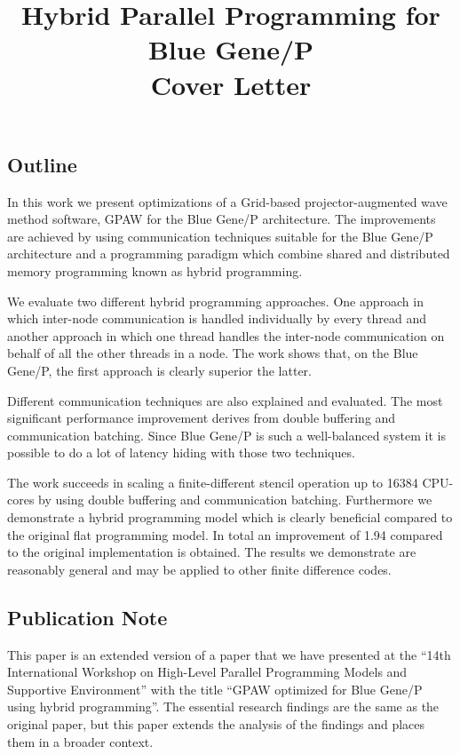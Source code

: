 \documentclass[a4paper,10pt]{article}
\title{Hybrid Parallel Programming for Blue Gene/P \\ Cover Letter}
\date{}
\begin{document}
\maketitle

\subsection*{Outline}
In this work we present optimizations of a Grid-based projector-augmented wave method software, GPAW for the Blue Gene/P architecture. The improvements are achieved by using communication techniques suitable for the Blue Gene/P architecture and a programming paradigm which combine shared and distributed memory programming known as hybrid programming.

We evaluate two different hybrid programming approaches. One approach in which inter-node communication is handled individually by every thread and another approach in which one thread handles the inter-node communication on behalf of all the other threads in a node. The work shows that, on the Blue Gene/P, the first approach is clearly superior the latter. 

Different communication techniques are also explained and evaluated. The most significant performance improvement derives from double buffering and communication batching. Since Blue Gene/P is such a well-balanced system it is possible to do a lot of latency hiding with those two techniques.

The work succeeds in scaling a finite-different stencil operation up to 16384 CPU-cores by using double buffering and communication batching. Furthermore we demonstrate a hybrid programming model which is clearly beneficial compared to the original flat programming model. In total an improvement of 1.94 compared to the original implementation is obtained. The results we demonstrate are reasonably general and may be applied to other finite difference codes.

\subsection*{Publication Note}
This paper is an extended version of a paper that we have presented at the ``14th International Workshop on High-Level Parallel Programming Models and Supportive Environment'' with the title ``GPAW optimized for Blue Gene/P using hybrid programming''. The essential research findings are the same as the original paper, but this paper extends the analysis of the findings and places them in a broader context.
\end{document}
